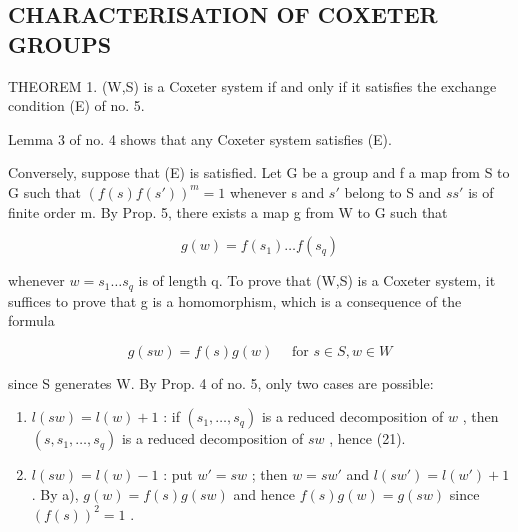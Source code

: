 \subsection{CHARACTERISATION OF COXETER GROUPS}

THEOREM 1. (W,S) is a Coxeter system if and only if it satisfies the exchange condition (E) of no. 5.

Lemma 3 of no. 4 shows that any Coxeter system satisfies (E).

Conversely, suppose that (E) is satisfied. Let G be a group and f a map from S to G such that \((f(s)f(s'))^{m}=1\) whenever s and \(s'\) belong to S and \(ss'\) is of finite order m. By Prop. 5, there exists a map g from W to G such that

\[
g (w) = f (s _ {1}) \dots f (s _ {q})\tag{20}
\]

whenever \(w = s_{1} \ldots s_{q}\) is of length q. To prove that (W,S) is a Coxeter system, it suffices to prove that g is a homomorphism, which is a consequence of the formula

\[
g (s w) = f (s) g (w) \quad \text { for } s \in S, w \in W\tag{21}
\]

since S generates W. By Prop. 4 of no. 5, only two cases are possible:

\begin{enumerate}
\def\labelenumi{\alph{enumi})}
\item
  \(l(sw) = l(w) + 1\) : if \((s_1, \ldots, s_q)\) is a reduced decomposition of \(w\) , then \((s, s_1, \ldots, s_q)\) is a reduced decomposition of \(sw\) , hence (21).
\item
  \(l(sw) = l(w) - 1\) : put \(w' = sw\) ; then \(w = sw'\) and \(l(sw') = l(w') + 1\) . By a), \(g(w) = f(s)g(sw)\) and hence \(f(s)g(w) = g(sw)\) since \((f(s))^{2} = 1\) .
\end{enumerate}

